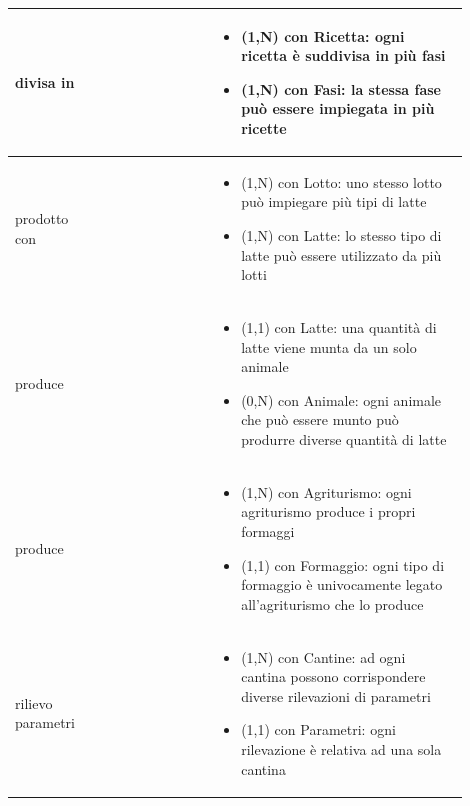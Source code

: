 \documentclass[12pt,a4paper]{article}
\begin{document}
\begin{center}
\begin{longtable}{|p{0.16\linewidth}|p{0.24\linewidth}|p{0.50\linewidth}|}
\hline
divisa in 				&   
					& \begin{itemize}
						\setlength{\itemindent}{-1em}
						\vspace{-25pt}
						\setlength\itemsep{-0.25em}
						\item (1,N) con Ricetta: ogni ricetta è suddivisa in più fasi
						\item (1,N) con Fasi: la stessa fase può essere impiegata in più ricette
					\end{itemize}\\ 

\hline
prodotto con 				&   
					& \begin{itemize}
						\setlength{\itemindent}{-1em}
						\vspace{-25pt}
						\setlength\itemsep{-0.25em}
						\item (1,N) con Lotto: uno stesso lotto può impiegare più tipi di latte
						\item (1,N) con Latte: lo stesso tipo di latte può essere utilizzato da più lotti
					\end{itemize}\\ 

\hline
produce 				&   
					& \begin{itemize}
						\setlength{\itemindent}{-1em}
						\vspace{-25pt}
						\setlength\itemsep{-0.25em}
						\item (1,1) con Latte: una quantità di latte viene munta da un solo animale
						\item (0,N) con Animale: ogni animale che può essere munto può produrre diverse quantità di latte
					\end{itemize}\\ 

\hline
produce 				&   
					& \begin{itemize}
						\setlength{\itemindent}{-1em}
						\vspace{-25pt}
						\setlength\itemsep{-0.25em}
						\item (1,N) con Agriturismo: ogni agriturismo produce i propri formaggi
						\item (1,1) con Formaggio: ogni tipo di formaggio è univocamente legato all'agriturismo che lo produce
					\end{itemize}\\ 

\hline
rilievo parametri 				&   
					& \begin{itemize}
						\setlength{\itemindent}{-1em}
						\vspace{-25pt}
						\setlength\itemsep{-0.25em}
						\item (1,N) con Cantine: ad ogni cantina possono corrispondere diverse rilevazioni di parametri
						\item (1,1) con Parametri: ogni rilevazione è relativa ad una sola cantina
					\end{itemize}\\ 


\end{longtable}
\end{center}
\end{document}
